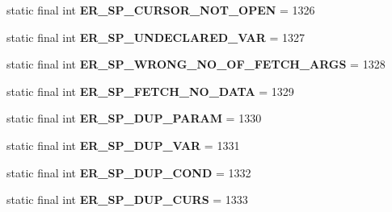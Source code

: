 \begin{DoxyCompactItemize}
static final int {\bfseries E\+R\+\_\+\+S\+P\+\_\+\+C\+U\+R\+S\+O\+R\+\_\+\+N\+O\+T\+\_\+\+O\+P\+EN} = 1326
\item 
\mbox{\label{classcom_1_1mysql_1_1jdbc_1_1_mysql_error_numbers_a7a14bbeeba795af5cd65ab1d327a4662}} 
static final int {\bfseries E\+R\+\_\+\+S\+P\+\_\+\+U\+N\+D\+E\+C\+L\+A\+R\+E\+D\+\_\+\+V\+AR} = 1327
\item 
\mbox{\label{classcom_1_1mysql_1_1jdbc_1_1_mysql_error_numbers_ae9942766360296d99566a8112f79a557}} 
static final int {\bfseries E\+R\+\_\+\+S\+P\+\_\+\+W\+R\+O\+N\+G\+\_\+\+N\+O\+\_\+\+O\+F\+\_\+\+F\+E\+T\+C\+H\+\_\+\+A\+R\+GS} = 1328
\item 
\mbox{\label{classcom_1_1mysql_1_1jdbc_1_1_mysql_error_numbers_a25d5735f830350d88d43bd0ad961905e}} 
static final int {\bfseries E\+R\+\_\+\+S\+P\+\_\+\+F\+E\+T\+C\+H\+\_\+\+N\+O\+\_\+\+D\+A\+TA} = 1329
\item 
\mbox{\label{classcom_1_1mysql_1_1jdbc_1_1_mysql_error_numbers_a36e7f50541ac2c3dea36eb256b400157}} 
static final int {\bfseries E\+R\+\_\+\+S\+P\+\_\+\+D\+U\+P\+\_\+\+P\+A\+R\+AM} = 1330
\item 
\mbox{\label{classcom_1_1mysql_1_1jdbc_1_1_mysql_error_numbers_a25778ea5fcc9c7bfb188f15ab33708d5}} 
static final int {\bfseries E\+R\+\_\+\+S\+P\+\_\+\+D\+U\+P\+\_\+\+V\+AR} = 1331
\item 
\mbox{\label{classcom_1_1mysql_1_1jdbc_1_1_mysql_error_numbers_ad996ed0fe0bbf9821d9afbf3aecce5b5}} 
static final int {\bfseries E\+R\+\_\+\+S\+P\+\_\+\+D\+U\+P\+\_\+\+C\+O\+ND} = 1332
\item 
\mbox{\label{classcom_1_1mysql_1_1jdbc_1_1_mysql_error_numbers_a40e5467bcb74128c5a392f48cc573fa2}} 
static final int {\bfseries E\+R\+\_\+\+S\+P\+\_\+\+D\+U\+P\+\_\+\+C\+U\+RS} = 1333
\item 
\mbox{\label{classcom_1_1mysql_1_1jdbc_1_1_mysql_error_numbers_a169db452acb8f36a7bb3839ddb53d286}} 

\end{DoxyCompactItemize}
